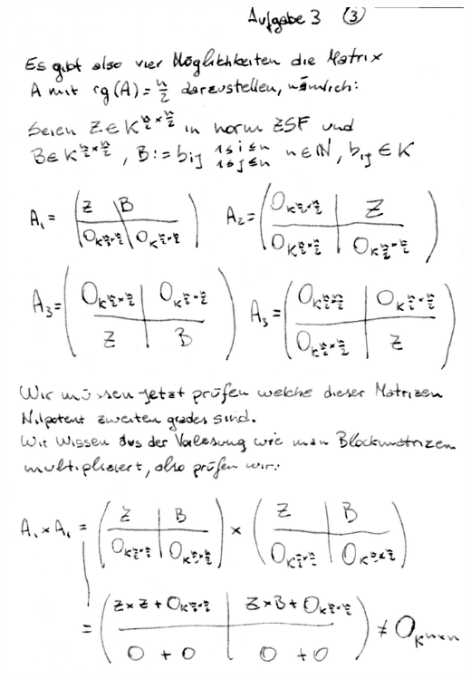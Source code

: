 \documentclass[10pt,a4paper]{article}
\begin{document}
\includegraphics[scale=0.25]{lat1_7.jpg}  \\
\end{document}
